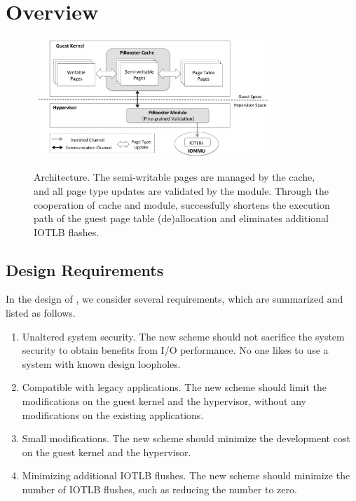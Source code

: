 \section{\name Overview} \label{sec:overview}
\begin{figure}[ht]
\centering
\includegraphics[width=0.8\textwidth]{image/overview/arch.pdf} \\
\caption{\name Architecture. The semi-writable pages are managed by the \name cache, and all page type updates are validated by the \name module.
Through the cooperation of \name cache and \name module, \name successfully shortens the execution path of the guest page table (de)allocation and eliminates additional IOTLB flashes.}
\label{fig:arch}
\end{figure}

\subsection{Design Requirements}\label{sec:req}
In the design of \name, we consider several requirements, which are summarized and listed as follows.
\begin{enumerate}
\item Unaltered system security. The new scheme should not sacrifice the system security to obtain benefits from I/O performance. No one likes to use a system with known design loopholes.
\item Compatible with legacy applications. The new scheme should limit the modifications on the guest kernel and the hypervisor, without any modifications on the existing applications.
\item Small modifications. The new scheme should minimize the development cost on the guest kernel and the hypervisor.
\item Minimizing additional IOTLB flushes. The new scheme should minimize the number of IOTLB flushes, such as reducing the number to zero.
\end{enumerate}


